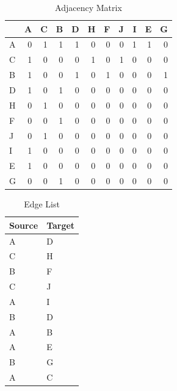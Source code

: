 \documentclass[
]{book}
\begin{document}
\begin{table}

\caption{\label{tab:ADJ}Adjacency Matrix}
\centering
\begin{tabular}[t]{l|r|r|r|r|r|r|r|r|r|r}
\hline
  & A & C & B & D & H & F & J & I & E & G\\
\hline
A & 0 & 1 & 1 & 1 & 0 & 0 & 0 & 1 & 1 & 0\\
\hline
C & 1 & 0 & 0 & 0 & 1 & 0 & 1 & 0 & 0 & 0\\
\hline
B & 1 & 0 & 0 & 1 & 0 & 1 & 0 & 0 & 0 & 1\\
\hline
D & 1 & 0 & 1 & 0 & 0 & 0 & 0 & 0 & 0 & 0\\
\hline
H & 0 & 1 & 0 & 0 & 0 & 0 & 0 & 0 & 0 & 0\\
\hline
F & 0 & 0 & 1 & 0 & 0 & 0 & 0 & 0 & 0 & 0\\
\hline
J & 0 & 1 & 0 & 0 & 0 & 0 & 0 & 0 & 0 & 0\\
\hline
I & 1 & 0 & 0 & 0 & 0 & 0 & 0 & 0 & 0 & 0\\
\hline
E & 1 & 0 & 0 & 0 & 0 & 0 & 0 & 0 & 0 & 0\\
\hline
G & 0 & 0 & 1 & 0 & 0 & 0 & 0 & 0 & 0 & 0\\
\hline
\end{tabular}
\end{table}

\begin{table}

\caption{\label{tab:EL}Edge List}
\centering
\begin{tabular}[t]{l|l}
\hline
Source & Target\\
\hline
A & D\\
\hline
C & H\\
\hline
B & F\\
\hline
C & J\\
\hline
A & I\\
\hline
B & D\\
\hline
A & B\\
\hline
A & E\\
\hline
B & G\\
\hline
A & C\\
\hline
\end{tabular}
\end{table}
\end{document}
